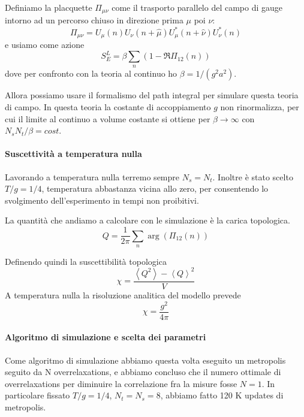 \documentclass[a4paper, 12pt]{article}
\begin{document}
Definiamo la placquette $\Pi_{\mu\nu}$ come il trasporto parallelo del campo di
gauge intorno ad un percorso chiuso in direzione prima $\mu$ poi $\nu$:
\begin{equation}
\Pi_{\mu\nu} = U_{\mu}(n) U_{\nu}(n+\hat{\mu}) U^*_{\mu}(n+\hat{\nu}) U^*_{\nu}(n)
\end{equation}
e usiamo come azione
\begin{equation}
S_E^L = \beta \sum_n \left( 1-\Re \Pi_{12}(n) \right)
\end{equation}
dove per confronto con la teoria al continuo ho $\beta = 1 / (g^2 a^2)$.

Allora possiamo usare il formalismo del path integral per simulare questa teoria
di campo.
In questa teoria la costante di accoppiamento $g$ non rinormalizza, per cui
il limite al continuo a volume costante si ottiene per $\beta \rightarrow \infty$
con $N_s N_t / \beta = cost$.


\paragraph{Suscettività a temperatura nulla}
Lavorando a temperatura nulla terremo sempre $N_s=N_t$.
Inoltre è stato scelto $T/g = 1 / 4$, temperatura abbastanza vicina allo zero,
per consentendo lo svolgimento dell'esperimento in tempi non proibitivi.

La quantità che andiamo a calcolare con le simulazione è la carica topologica.
\begin{equation}
Q = \frac{1}{2 \pi} \sum_n \arg(\Pi_{12}(n))
\end{equation}

Definendo quindi la suscettibilità topologica
\begin{equation}
\chi = \frac{\left< Q^2 \right> - \left< Q \right>^2}{V}
\end{equation}
A temperatura nulla la risoluzione analitica del modello prevede
\begin{equation}
\chi = \frac{g^2}{4 \pi}
\end{equation}

\paragraph{Algoritmo di simulazione e scelta dei parametri}
Come algoritmo di simulazione abbiamo questa volta eseguito un metropolis
seguito da N overrelaxations, e abbiamo concluso che il numero ottimale di
overrelaxations per diminuire la correlazione fra la misure fosse $N=1$.
In particolare fissato $T/g = 1 / 4$, $N_t=N_s=8$, abbiamo fatto 120 K updates
di metropolis.
\end{document}
